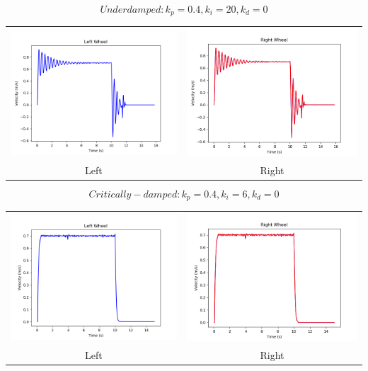 \documentclass[conference]{IEEEtran}
\begin{document}
\[ Underdamped: k_p=0.4, k_i=20, k_d=0 \]
\begin{tabular}{cc}
\includegraphics[width=0.45\linewidth]{step_0_4_20_0_left.png} &   \includegraphics[width=0.45\linewidth]{step_0_4_20_0_right.png} \\
Left & Right \\[6pt]
\end{tabular}
\[ Critically-damped: k_p=0.4, k_i=6, k_d=0 \]
\begin{tabular}{cc}
\includegraphics[width=0.45\linewidth]{step_0_4_6_0_left.png} &   \includegraphics[width=0.45\linewidth]{step_0_4_6_0_right.png} \\
Left & Right \\[6pt]
\end{tabular}
\end{document}
